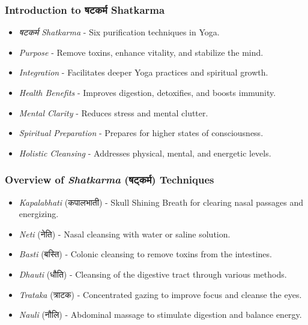 \begin{frame}[fragile]\frametitle{Introduction to षटकर्म Shatkarma}

  \begin{itemize}
	\item \textit{षटकर्म Shatkarma} - Six purification techniques in Yoga.
	\item \textit{Purpose} - Remove toxins, enhance vitality, and stabilize the mind.
	\item \textit{Integration} - Facilitates deeper Yoga practices and spiritual growth.
	\item \textit{Health Benefits} - Improves digestion, detoxifies, and boosts immunity.
	\item \textit{Mental Clarity} - Reduces stress and mental clutter.
	\item \textit{Spiritual Preparation} - Prepares for higher states of consciousness.
	\item \textit{Holistic Cleansing} - Addresses physical, mental, and energetic levels.
  \end{itemize}

\end{frame}

\begin{frame}[fragile]\frametitle{Overview of \textit{Shatkarma} (षट्कर्म) Techniques}

      \begin{itemize}
        \item \textit{Kapalabhati} (कपालभाती) - Skull Shining Breath for clearing nasal passages and energizing.
        \item \textit{Neti} (नेति) - Nasal cleansing with water or saline solution.
        \item \textit{Basti} (बस्ति) - Colonic cleansing to remove toxins from the intestines.
        \item \textit{Dhauti} (धौति) - Cleansing of the digestive tract through various methods.
        \item \textit{Trataka} (त्राटक) - Concentrated gazing to improve focus and cleanse the eyes.
        \item \textit{Nauli} (नौलि) - Abdominal massage to stimulate digestion and balance energy.
      \end{itemize}

\end{frame}



